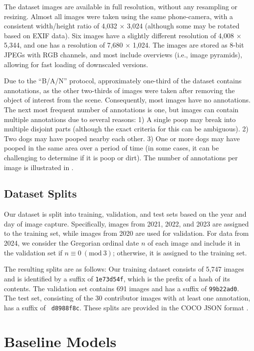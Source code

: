 \documentclass[10pt,twocolumn,letterpaper]{article}
\begin{document}
The dataset images are available in full resolution, without any resampling or resizing.
Almost all images were taken using the same phone-camera, with a consistent width/height ratio of 4,032
  $\times$ 3,024 (although some may be rotated based on EXIF data).
Six images have a slightly different resolution of 4,008 $\times$ 5,344, and one has a resolution of 7,680
  $\times$ 1,024.
The images are stored as 8-bit JPEGs with RGB channels, and most include overviews (i.e., image pyramids),
  allowing for fast loading of downscaled versions.


Due to the ``B/A/N'' protocol, approximately one-third of the dataset contains annotations, as the other
  two-thirds of images were taken after removing the object of interest from the scene.
Consequently, most images have no annotations.
The next most frequent number of annotations is one, but images can contain multiple annotations due to
  several reasons:
1) A single poop may break into multiple disjoint parts (although the exact criteria for this can be
  ambiguous).
2) Two dogs may have pooped nearby each other.
3) One or more dogs may have pooped in the same area over a period of time (in some cases, it can be
  challenging to determine if it is poop or dirt).
The number of annotations per image is illustrated in .


\subsection{Dataset Splits}

Our dataset is split into training, validation, and test sets based on the year and day of image capture.
Specifically, images from 2021, 2022, and 2023 are assigned to the training set, while images from 2020 are
  used for validation.
For data from 2024, we consider the Gregorian ordinal date $n$ of each image and include it in the validation set if
$n \equiv 0 \ (\textrm{mod}\ 3)$; otherwise, it is assigned to the training set.

The resulting splits are as follows:
Our training dataset consists of 5,747 images and is identified by a suffix of {\tt 1e73d54f}, which is the
  prefix of a hash of its contents.
The validation set contains 691 images and has a suffix of {\tt 99b22ad0}.
The test set, consisting of the 30 contributor images with at least one annotation, has a suffix of {\tt
  d8988f8c}.
These splits are provided in the COCO JSON format \cite{lin_microsoft_2014}.


\section{Baseline Models}
\label{sec:models}
\end{document}
